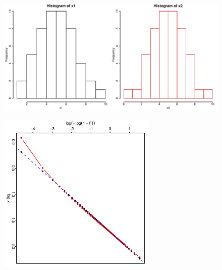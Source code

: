 \begin{frame}   %
\begin{figure}[h]
   \includegraphics[width=4.5in]{hist2.pdf} %
   \vspace{-3ex}
\end{figure}
\end{frame}
\begin{frame}   %
\begin{figure}[h]
   \includegraphics[width=3.0in,angle=90]{Weibull2.pdf} %
   \vspace{-3ex}
\end{figure}
\end{frame}

